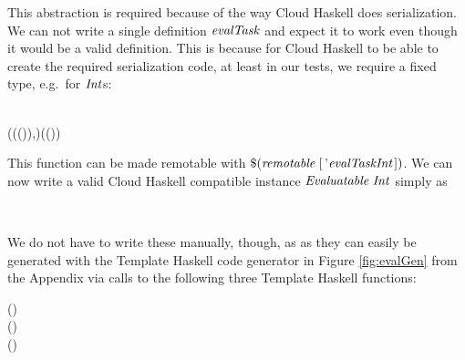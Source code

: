 \documentclass[paper=A4,twoside=true,openright,parskip=full,chapterprefix=true,headings=normal,bibliography=totoc,listof=totoc,titlepage=on,captions=tableabove,draft=false,british]{scrreprt}%
\begin{document}
This abstraction is required because of the way Cloud Haskell does
serialization. We can not write a single definition \ensuremath{\Varid{evalTask}} and
expect it to work even though it would be a valid definition. This is
because for Cloud Haskell to be able to create the required
serialization code, at least in our tests, we require a fixed type,
e.g.~for \ensuremath{\Conid{Int}}s:


\begin{hscode}\SaveRestoreHook
{}%
%
%
\>[B]{}\mathbin{::}{}\<[E]%
\\
\>[B]{}\<[5]%
\>[5]{}(\;(\;(\;)),\;)\to {}\;(\;()){}\<[E]%
\ColumnHook
\end{hscode}\resethooks
\vspace{-2\baselineskip}

This function can be made remotable with
\ensuremath{\mathbin{\$}(\Varid{remotable}\;[\mskip1.5mu }'\ensuremath{\Varid{evalTaskInt}\mskip1.5mu])}. We can now write a valid Cloud Haskell
compatible instance \ensuremath{\Conid{Evaluatable}\;\Conid{Int}} simply as


\begin{hscode}\SaveRestoreHook
{}%
%
%
\>[B]{}\;\;\;\<[E]%
\\
\>[B]{}\<[5]%
\>[5]{}\mathrel{=}\<[E]%
\ColumnHook
\end{hscode}\resethooks
\vspace{-2\baselineskip}

We do not have to write these manually, though, as as they can easily be
generated with the Template Haskell code generator in Figure
\ref{fig:evalGen} from the Appendix via calls to the following three
Template Haskell functions:


\begin{hscode}\SaveRestoreHook
{}%
%
\>[B]{}\mathbin{\$}(){}\<[E]%
\\
\>[B]{}\mathbin{\$}(){}\<[E]%
\\
\>[B]{}\mathbin{\$}(){}\<[E]%
\ColumnHook
\end{hscode}\resethooks
\vspace{-2\baselineskip}
\end{document}
